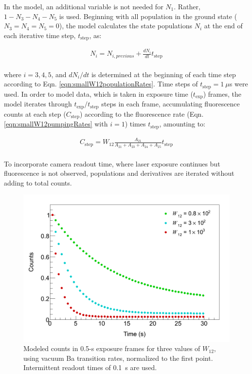 \noindent
In the model, an additional variable is not needed for $N_{1}$.  Rather, $1 - N_{3} - N_{4} - N_{5}$ is used.  Beginning with all population in the ground state ($N_{3} = N_{4} = N_{5} = 0$), the model calculates the state populations $N_{i}$ at the end of each iterative time step, $t_{\text{step}}$, as:

\begin{equation}
\begin{aligned}
N_{i} = N_{i, previous} + \frac{dN_i}{dt}t_{\text{step}} \\
\end{aligned}
\label{eqn:smallW12populations}
\end{equation}

\noindent
where $i = 3,4,5$, and $dN_i/dt$ is determined at the beginning of each time step according to Eqn. \ref{eqn:smallW12populationRates}.  Time steps of $t_{\text{step}} = 1~\mu$s were used.  In order to model data, which is taken in exposure time ($t_{\text{exp}}$) frames, the model iterates through $t_{\text{exp}}/t_{\text{step}}$ steps in each frame, accumulating fluorescence counts at each step ($C_{\text{step}}$) according to the fluorescence rate (Eqn. \ref{eqn:smallW12pumpingRates} with $i = 1$) times $t_{\text{step}}$, amounting to:

\begin{equation}
\begin{aligned}
C_{\text{step}} = W_{12}\frac{A_{21}}{A_{21} + A_{23} + A_{24} + A_{25}}t_{\text{step}} \\
\end{aligned}
\label{eqn:smallW12counts}
\end{equation}

\noindent
To incorporate camera readout time, where laser exposure continues but fluorescence is not observed, populations and derivatives are iterated without adding to total counts.

\begin{figure} %
        \centering
                \includegraphics[width=.7\textwidth]{figures/thesis_modelExamples.png}
                \caption{Modeled counts in 0.5-s exposure frames for three values of $W_{12}$, using vacuum Ba transition rates, normalized to the first point.  Intermittent readout times of 0.1~s are used. }
\label{fig:modelExample}
\end{figure}

